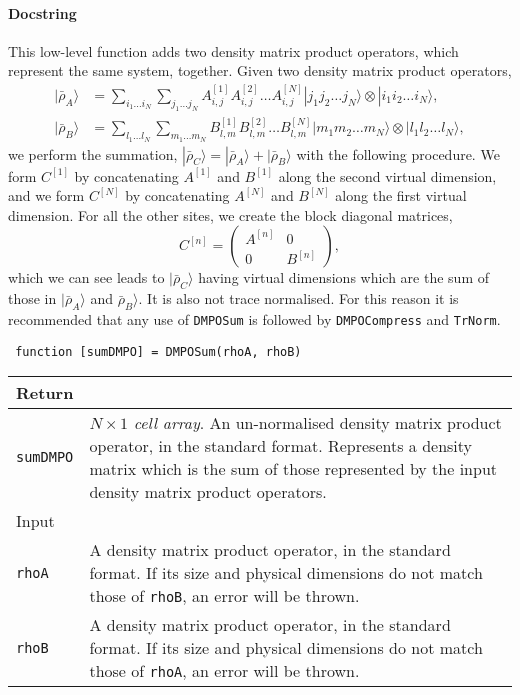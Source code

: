  \paragraph{Docstring} This low-level function adds two density matrix product operators, which represent the same system, together. Given two density matrix product operators,
 \begin{align}
 |\bar{\rho}_{A} \rangle &= \sum_{i_{1}\ldots i_{N}} \sum_{j_{1} \ldots j_{N}} A^{[1]}_{i,j} A^{[2]}_{i,j} \ldots A^{[N]}_{i,j} |j_{1} j_{2} \ldots j_{N} \rangle \otimes |i_{1} i_{2} \ldots i_{N} \rangle, \label{eq:vs3-5} \\
 |\bar{\rho}_{B} \rangle &= \sum_{l_{1} \ldots l_{N}} \sum_{m_{1} \ldots m_{N}} B^{[1]}_{l,m} B^{[2]}_{l,m} \ldots B^{[N]}_{l,m} |m_{1} m_{2} \ldots m_{N} \rangle \otimes |l_{1} l_{2} \ldots l_{N} \rangle, \label{eq:vs3-6}
 \end{align}
 we perform the summation, \(|\bar{\rho}_{C} \rangle = |\bar{\rho}_{A} \rangle + |\bar{\rho}_{B} \rangle\) with the following procedure. We form \(C^{[1]}\) by concatenating \(A^{[1]}\) and \(B^{[1]}\) along the second virtual dimension, and we form \(C^{[N]}\) by concatenating \(A^{[N]}\) and \(B^{[N]}\) along the first virtual dimension. For all the other sites, we create the block diagonal matrices,
 \begin{equation}
 C^{[n]} = \begin{pmatrix}
 A^{[n]} & 0 \\
 0 & B^{[n]} \end{pmatrix},
 \label{eq:vs3-7}
 \end{equation}
 which we can see leads to \(|\bar{\rho}_{C} \rangle \) having virtual dimensions which are the sum of those in \(|\bar{\rho}_{A}\rangle\) and \(\bar{\rho}_{B}\rangle\). It is also not trace normalised. For this reason it is recommended that any use of \lstinline$DMPOSum$ is followed by \lstinline$DMPOCompress$ and \lstinline$TrNorm$.
 \begin{lstlisting}
 function [sumDMPO] = DMPOSum(rhoA, rhoB) \end{lstlisting}
 \begin{longtabu}{X[1,l]X[4,l]}
 \hline
 Return & \\ \hline
 \lstinline$sumDMPO$ & \emph{\(N \times 1\) cell array}. An un-normalised density matrix product operator, in the standard format. Represents a density matrix which is the sum of those represented by the input density matrix product operators. \\ \hline
 Input & \\ \hline
 \lstinline$rhoA$ & A density matrix product operator, in the standard format. If its size and physical dimensions do not match those of \lstinline$rhoB$, an error will be thrown. \\
 \lstinline$rhoB$ & A density matrix product operator, in the standard format. If its size and physical dimensions do not match those of \lstinline$rhoA$, an error will be thrown. \\
 \hline
 \end{longtabu}
